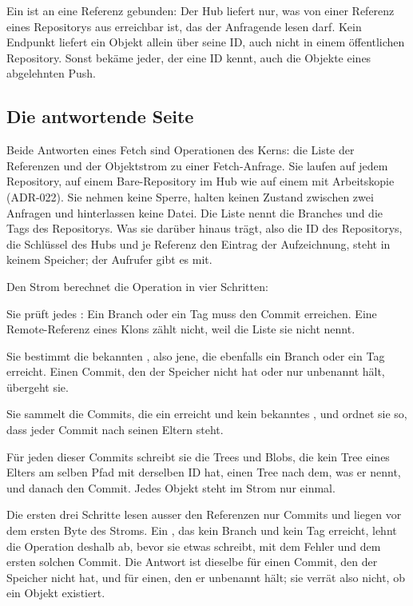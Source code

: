 Ein  ist an eine Referenz gebunden: Der Hub liefert nur, was von einer Referenz eines
Repositorys aus erreichbar ist, das der Anfragende lesen darf.
Kein Endpunkt liefert ein Objekt allein über seine ID, auch nicht in einem öffentlichen
Repository.
Sonst bekäme jeder, der eine ID kennt, auch die Objekte eines abgelehnten Push.

\subsection[sec:fetch-answer]{Die antwortende Seite}

Beide Antworten eines Fetch sind Operationen des Kerns: die Liste der Referenzen und der
Objektstrom zu einer Fetch-Anfrage.
Sie laufen auf jedem Repository, auf einem Bare-Repository im Hub wie auf einem mit Arbeitskopie
(ADR-022).
Sie nehmen keine Sperre, halten keinen Zustand zwischen zwei Anfragen und hinterlassen keine
Datei.
Die Liste nennt die Branches und die Tags des Repositorys.
Was sie darüber hinaus trägt, also die ID des Repositorys, die Schlüssel des Hubs und je
Referenz den Eintrag der Aufzeichnung, steht in keinem Speicher; der Aufrufer gibt es mit.

Den Strom berechnet die Operation in vier Schritten:

\startitemize[n]
\item Sie prüft jedes : Ein Branch oder ein Tag muss den Commit erreichen.
Eine Remote-Referenz eines Klons zählt nicht, weil die Liste sie nicht nennt.
\item Sie bestimmt die bekannten , also jene, die ebenfalls ein Branch oder ein Tag
erreicht.
Einen Commit, den der Speicher nicht hat oder nur unbenannt hält, übergeht sie.
\item Sie sammelt die Commits, die ein  erreicht und kein bekanntes ,
und ordnet sie so, dass jeder Commit nach seinen Eltern steht.
\item Für jeden dieser Commits schreibt sie die Trees und Blobs, die kein Tree eines Elters am
selben Pfad mit derselben ID hat, einen Tree nach dem, was er nennt, und danach den Commit.
Jedes Objekt steht im Strom nur einmal.
\stopitemize

Die ersten drei Schritte lesen ausser den Referenzen nur Commits und liegen vor dem ersten Byte
des Stroms.
Ein , das kein Branch und kein Tag erreicht, lehnt die Operation deshalb ab, bevor
sie etwas schreibt, mit dem Fehler  und dem ersten solchen Commit.
Die Antwort ist dieselbe für einen Commit, den der Speicher nicht hat, und für einen, den er
unbenannt hält; sie verrät also nicht, ob ein Objekt existiert.


